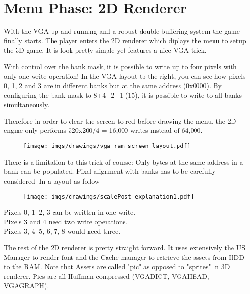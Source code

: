 \section{Menu Phase: 2D Renderer}
With the VGA up and running and a robust double buffering system the game finally starts. The player enters the 2D renderer which diplays the menu to setup the 3D game. It is look pretty simple yet features a nice VGA trick.
\par
\begin{figure}[H]
\centering
{}
\end{figure}
\par


\begin{minipage}{.55\textwidth}
With control over the bank mask, it is possible to write up to four pixels with only one write operation! In the VGA layout to the right, you can see how pixels 0, 1, 2 and 3 are in different banks but at the same address (0x0000). By configuring the bank mask to 8+4+2+1 (15), it is possible to write to all banks simultaneously.\\
\par
Therefore in order to clear the screen to red before drawing the menu, the 2D engine only performs 320x200/4 = 16,000 writes instead of 64,000.\\
\par
\end{minipage}
\begin{minipage}{.4\textwidth}
\begin{figure}[H]
\centering
\texttt{[image: imgs/drawings/vga\_ram\_screen\_layout.pdf]}
\end{figure}
\end{minipage}

\par



There is a limitation to this trick of course: Only bytes at the same address in a bank can be populated. Pixel alignment with banks has to be carefully considered. In a layout as follow\\
\par
\begin{figure}[H]
\centering
 \texttt{[image: imgs/drawings/scalePost\_explanation1.pdf]}
 \end{figure}
Pixels 0, 1, 2, 3 can be written in one write.\\
Pixels 3 and 4 need two write operations.\\
Pixels 3, 4, 5, 6, 7, 8 would need three.\\


\par
The rest of the 2D renderer is pretty straight forward. It uses extensively the US Manager to render font and the Cache manager to retrieve the assets from HDD to the RAM. Note that Assets are called "pic" as opposed to "sprites" in 3D renderer. Pics are all Huffman-compressed (VGADICT, VGAHEAD, VGAGRAPH).
\par
{}